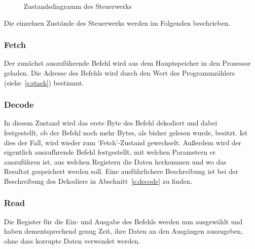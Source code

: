 \begin{figure}[htb]
\centering
{}
\caption{Zustandsdiagramm des Steuerwerks}
\label{pic:zustandsdiagramm}
\end{figure}
\pagebreak
Die einzelnen Zustände des Steuerwerks werden im Folgenden beschrieben.
\subsubsection{Fetch}
Der zunächst auszuführende Befehl wird aus dem Hauptspeicher in den Prozessor
geladen. Die Adresse des Befehls wird durch den Wert des Programmzählers
(siehe~\ref{s:stack}) bestimmt.
\subsubsection{Decode}
In diesem Zustand wird das erste Byte des Befehl dekodiert und dabei
festgestellt, ob der Befehl noch mehr Bytes, als bisher gelesen wurde, besitzt.
Ist dies der Fall, wird wieder zum `Fetch'-Zustand gewechselt. Außerdem wird der
eigentlich auszufhrende Befehl festgestellt, mit welchen Parametern er
auszuführen ist, aus welchen Registern die Daten herkommen und wo das Resultat
gespeichert werden soll. Eine ausführlichere Beschreibung ist bei der
Beschreibung des Dekodiers in Abschnitt~\ref{s:decode} zu finden.
\subsubsection{Read}
Die Register für die Ein- und Ausgabe des Befehls werden nun ausgewählt und
haben dementsprechend genug Zeit, ihre Daten an den Ausgängen auszugeben, ohne
dass korrupte Daten verwendet werden.

